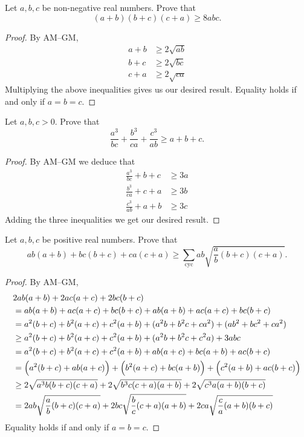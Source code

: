 \begin{exercise}
Let $a, b, c$ be non-negative real numbers. Prove that
\[ (a+b)(b+c)(c+a) \ge 8abc. \]
\end{exercise}

\begin{proof}
By AM--GM,
\begin{align*}
a+b &\ge 2\sqrt{ab} \\
b+c &\ge 2\sqrt{bc} \\
c+a &\ge 2\sqrt{ca}
\end{align*}
Multiplying the above inequalities gives us our desired result. Equality holds if and only if $a=b=c$.
\end{proof}

\begin{exercise}
Let $a, b, c > 0$. Prove that
\[ \frac{a^3}{bc}+\frac{b^3}{ca}+\frac{c^3}{ab} \ge a+b+c. \]
\end{exercise}

\begin{proof}
By AM--GM we deduce that
\begin{align*}
\frac{a^3}{bc}+b+c &\ge 3a \\
\frac{b^3}{ca}+c+a &\ge 3b \\
\frac{c^3}{ab}+a+b &\ge 3c
\end{align*}
Adding the three inequalities we get our desired result.
\end{proof}

\begin{exercise}
Let $a, b, c$ be positive real numbers. Prove that
\[ ab(a+b)+bc(b+c)+ca(c+a) \ge \sum_\text{cyc} ab\sqrt{\frac{a}{b}(b+c)(c+a)}. \]
\end{exercise}
\begin{proof}
By AM--GM,
\begin{align*}
&2ab(a+b)+2ac(a+c)+2bc(b+c) \\
&= ab(a+b)+ac(a+c)+bc(b+c)+ab(a+b)+ac(a+c)+bc(b+c) \\
&= a^2(b+c)+b^2(a+c)+c^2(a+b)+(a^2b+b^2c+ca^2)+(ab^2+bc^2+ca^2) \\
&\ge a^2(b+c)+b^2(a+c)+c^2(a+b)+(a^2b+b^2c+c^2a)+3abc \\
&= a^2(b+c)+b^2(a+c)+c^2(a+b)+ab(a+c)+bc(a+b)+ac(b+c) \\
&= \left(a^2(b+c)+ab(a+c)\right)+\left(b^2(a+c)+bc(a+b)\right)+\left(c^2(a+b)+ac(b+c)\right) \\
&\ge 2\sqrt{a^3b(b+c)(c+a)}+2\sqrt{b^3c(c+a)(a+b)}+2\sqrt{c^3a(a+b)(b+c)} \\
&= 2ab\sqrt{\frac{a}{b}(b+c)(c+a)}+2bc\sqrt{\frac{b}{c}(c+a)(a+b)}+2ca\sqrt{\frac{c}{a}(a+b)(b+c)}
\end{align*}
Equality holds if and only if $a=b=c$.
\end{proof}

